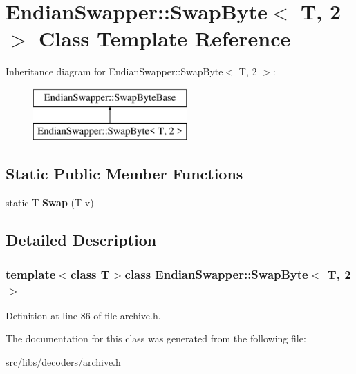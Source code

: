 \hypertarget{classEndianSwapper_1_1SwapByte_3_01T_00_012_01_4}{\section{Endian\-Swapper\-:\-:Swap\-Byte$<$ T, 2 $>$ Class Template Reference}
\label{classEndianSwapper_1_1SwapByte_3_01T_00_012_01_4}
}
Inheritance diagram for Endian\-Swapper\-:\-:Swap\-Byte$<$ T, 2 $>$\-:\begin{figure}[H]
\begin{center}
\leavevmode
\includegraphics[height=2.000000cm]{classEndianSwapper_1_1SwapByte_3_01T_00_012_01_4}
\end{center}
\end{figure}
\subsection*{Static Public Member Functions}
\begin{DoxyCompactItemize}
\item 
\hypertarget{classEndianSwapper_1_1SwapByte_3_01T_00_012_01_4_aaaee90b462efbeef6f6e2489afeaf69f}{static T {\bfseries Swap} (T v)}\label{classEndianSwapper_1_1SwapByte_3_01T_00_012_01_4_aaaee90b462efbeef6f6e2489afeaf69f}

\end{DoxyCompactItemize}


\subsection{Detailed Description}
\subsubsection*{template$<$class T$>$class Endian\-Swapper\-::\-Swap\-Byte$<$ T, 2 $>$}



Definition at line 86 of file archive.\-h.



The documentation for this class was generated from the following file\-:\begin{DoxyCompactItemize}
\item 
src/libs/decoders/archive.\-h\end{DoxyCompactItemize}

